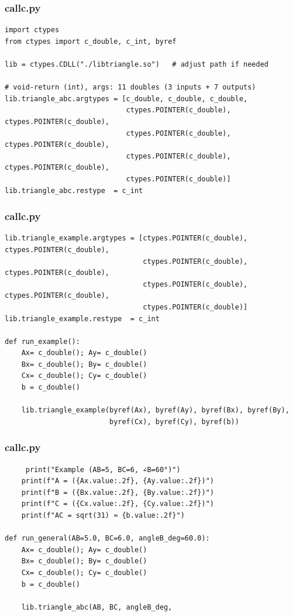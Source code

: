 \documentclass{beamer}
\begin{document}
\begin{frame}[fragile]
\frametitle{callc.py}
    \begin{lstlisting}    
import ctypes
from ctypes import c_double, c_int, byref

lib = ctypes.CDLL("./libtriangle.so")   # adjust path if needed

# void-return (int), args: 11 doubles (3 inputs + 7 outputs)
lib.triangle_abc.argtypes = [c_double, c_double, c_double,
                             ctypes.POINTER(c_double), ctypes.POINTER(c_double),
                             ctypes.POINTER(c_double), ctypes.POINTER(c_double),
                             ctypes.POINTER(c_double), ctypes.POINTER(c_double),
                             ctypes.POINTER(c_double)]
lib.triangle_abc.restype  = c_int

    \end{lstlisting}
\end{frame}
\begin{frame}[fragile]
\frametitle{callc.py}
\begin{lstlisting}
lib.triangle_example.argtypes = [ctypes.POINTER(c_double), ctypes.POINTER(c_double),
                                 ctypes.POINTER(c_double), ctypes.POINTER(c_double),
                                 ctypes.POINTER(c_double), ctypes.POINTER(c_double),
                                 ctypes.POINTER(c_double)]
lib.triangle_example.restype  = c_int

def run_example():
    Ax= c_double(); Ay= c_double()
    Bx= c_double(); By= c_double()
    Cx= c_double(); Cy= c_double()
    b = c_double()

    lib.triangle_example(byref(Ax), byref(Ay), byref(Bx), byref(By),
                         byref(Cx), byref(Cy), byref(b))

\end{lstlisting} 
\end{frame}
\begin{frame}[fragile]
\frametitle{callc.py}
\begin{lstlisting}
     print("Example (AB=5, BC=6, ∠B=60°)")
    print(f"A = ({Ax.value:.2f}, {Ay.value:.2f})")
    print(f"B = ({Bx.value:.2f}, {By.value:.2f})")
    print(f"C = ({Cx.value:.2f}, {Cy.value:.2f})")
    print(f"AC = sqrt(31) ≈ {b.value:.2f}")

def run_general(AB=5.0, BC=6.0, angleB_deg=60.0):
    Ax= c_double(); Ay= c_double()
    Bx= c_double(); By= c_double()
    Cx= c_double(); Cy= c_double()
    b = c_double()

    lib.triangle_abc(AB, BC, angleB_deg,
\end{lstlisting}
\end{frame}
\end{document}
